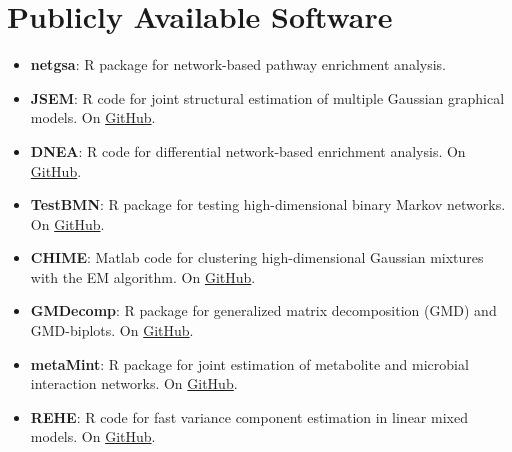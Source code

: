 \documentclass[10pt]{article}
\begin{document}
\section*{Publicly Available Software}
\begin{itemize}
\item {\bf netgsa}: R package for network-based pathway enrichment analysis. 
\item {\bf JSEM}: R code for joint structural estimation of multiple Gaussian graphical models. On \href{https://github.com/drjingma/JSEM}{GitHub}.
\item {\bf DNEA}: R code for differential network-based enrichment analysis. On \href{https://github.com/wiggie/DNEA}{GitHub}.
\item {\bf TestBMN}: R package for testing high-dimensional binary Markov networks. On \href{https://github.com/drjingma/TestBMN}{GitHub}.
\item {\bf CHIME}: Matlab code for clustering high-dimensional Gaussian mixtures with the EM algorithm. On \href{https://github.com/drjingma/gmm}{GitHub}.
\item {\bf GMDecomp}: R package for generalized matrix decomposition (GMD) and GMD-biplots. On \href{https://github.com/taryue/GMDecomp}{GitHub}.
\item \textbf{metaMint}: R package for joint estimation of metabolite and microbial interaction networks. On \href{https://github.com/drjingma/metaMint}{GitHub}.
\item \textbf{REHE}: R code for fast variance component estimation in linear mixed models. On \href{https://github.com/yuek9/REHE}{GitHub}.
\end{itemize}
\end{document}

